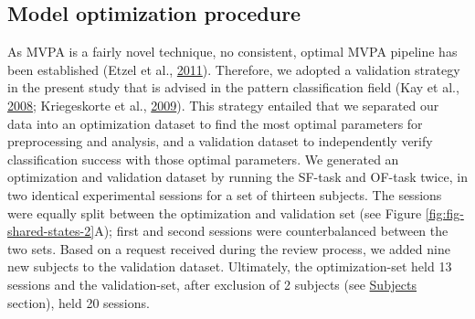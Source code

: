 \documentclass[12pt,american,a4paper,oneside,]{memoir} %
\begin{document}
\hypertarget{shared-states-methods-model-optimization-procedure}{%
\subsection{Model optimization procedure}\label{shared-states-methods-model-optimization-procedure}}

As MVPA is a fairly novel technique, no consistent, optimal MVPA pipeline has been established (Etzel et al., \protect\hyperlink{ref-etzel2011impact}{2011}). Therefore, we adopted a validation strategy in the present study that is advised in the pattern classification field (Kay et al., \protect\hyperlink{ref-kay2008identifying}{2008}; Kriegeskorte et al., \protect\hyperlink{ref-kriegeskorte2009circular}{2009}). This strategy entailed that we separated our data into an optimization dataset to find the most optimal parameters for preprocessing and analysis, and a validation dataset to independently verify classification success with those optimal parameters. We generated an optimization and validation dataset by running the SF-task and OF-task twice, in two identical experimental sessions for a set of thirteen subjects. The sessions were equally split between the optimization and validation set (see Figure \ref{fig:fig-shared-states-2}A); first and second sessions were counterbalanced between the two sets. Based on a request received during the review process, we added nine new subjects to the validation dataset. Ultimately, the optimization-set held 13 sessions and the validation-set, after exclusion of 2 subjects (see \protect\hyperlink{shared-states-methods-subjects}{Subjects} section), held 20 sessions.
\end{document}
